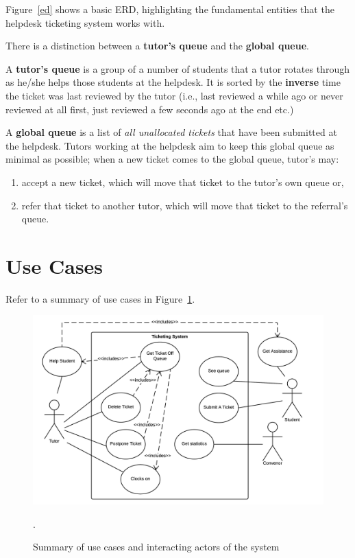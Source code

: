 \documentclass[12pt,a4paper,]{article}
\providecommand{\tightlist}{%
  \setlength{\itemsep}{0pt}\setlength{\parskip}{0pt}}
\begin{document}
Figure~\ref{ed} shows a basic ERD, highlighting the fundamental entities that the
helpdesk ticketing system works with.

There is a distinction between a \textbf{tutor's queue} and the \textbf{global queue}.

A \textbf{tutor's queue} is a group of a number of students that a tutor
rotates through as he/she helps those students at the helpdesk. It is
sorted by the \textbf{inverse} time the ticket was last reviewed by the
tutor (i.e., last reviewed a while ago or never reviewed at all first,
just reviewed a few seconds ago at the end etc.)

A \textbf{global queue} is a list of \emph{all unallocated tickets} that
have been submitted at the helpdesk. Tutors working at the helpdesk aim
to keep this global queue as minimal as possible; when a new ticket
comes to the global queue, tutor's may:

\begin{enumerate}
\def\labelenumi{\arabic{enumi}.}
\tightlist
\item
  accept a new ticket, which will move that ticket to the tutor's own
  queue or,
\item
  refer that ticket to another tutor, which will move that ticket to the
  referral's queue.
\end{enumerate}

\section{Use Cases}\label{use-cases}

Refer to a summary of use cases in Figure~\ref{uc}.

\begin{figure}
  \centering
  \includegraphics{8a6ccacc-322d-4611-af96-34ddbb8b820e.png}
  \caption{Summary of use cases and interacting actors of the system}.
  \label{uc}
\end{figure}
\end{document}
